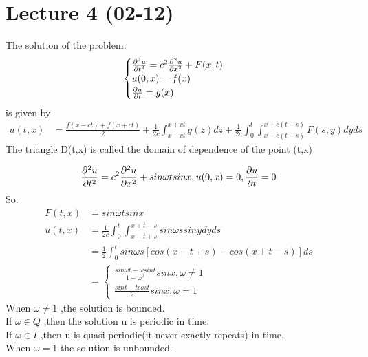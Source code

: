 \section{Lecture 4 (02-12)}
\begin{theorem}[]{}
The solution of the problem:
$$
    \begin{cases}
        \pdv[2]{u}{t}=c^2\pdv[2]{u}{x}+F(x,t)\\
        u(0,x)=f(x)\\
        \pdv{u}{t}(0,x)=g(x)
    \end{cases}
$$ is given by
\begin{align*}{}{}
u(t,x)&=\frac{f(x-ct)+f(x+ct)}{2}+\frac{1}{2c}\int_{x-ct}^{x+ct}g(z)dz+\frac{1}{2c}\int_{0}^{t}\int_{x-c(t-s)}^{x+c(t-s)}F(s,y)dyds
\end{align*}
The triangle D(t,x) is called the domain of dependence of the point (t,x)
\end{theorem}
\begin{example}[]{}
 $$
    \pdv[2]{u}{t}=c^2\pdv[2]{u}{x}+sin\omega tsinx,u(0,x)=0,\pdv{u}{t}(0,x)=0
 $$ 
 So:\begin{align*}{}{}
 F(t,x)&=sin\omega tsinx\\
 u(t,x)&=\frac{1}{2c}\int_{0}^{t}\int_{x-t+s}^{x+t-s}sin\omega ssinydyds\\
 &=\frac{1}{2}\int_{0}^{t}sin\omega s[cos(x-t+s)-cos(x+t-s)]ds\\
 &=\begin{cases}
    \frac{sin\omega t -\omega sint}{1-\omega^2}sinx, \omega\neq 1\\
    \frac{sint-tcost}{2}sinx, \omega=1
 \end{cases}
 \end{align*}
 When $ \omega\neq1 $ ,the solution is bounded.
 \\If $ \omega \in Q $ ,then the solution u is periodic in time.\\
 If $ \omega \in I $ ,then u is quasi-periodic(it never exactly repeats) in time.  \\
 When $ \omega=1 $ the solution is unbounded. 
\end{example}
